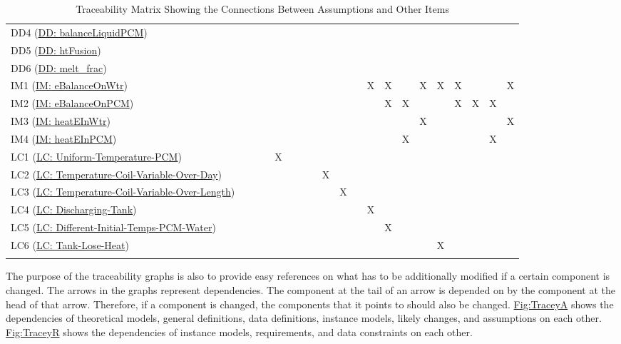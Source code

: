 \documentclass[12pt]{article}
\begin{document}
\begin{longtable}{l l l l l l l l l l l l l l l l l l l l}
DD4 (\hyperref[DD:balanceLiquidPCM]{DD: balanceLiquidPCM}) &  &  &  &  &  &  &  &  &  &  &  &  &  &  &  &  &  &  & 
\\
DD5 (\hyperref[DD:htFusion]{DD: htFusion}) &  &  &  &  &  &  &  &  &  &  &  &  &  &  &  &  &  &  & 
\\
DD6 (\hyperref[DD:melt.frac]{DD: melt\_frac}) &  &  &  &  &  &  &  &  &  &  &  &  &  &  &  &  &  &  & 
\\
IM1 (\hyperref[IM:eBalanceOnWtr]{IM: eBalanceOnWtr}) &  &  &  &  &  &  &  &  &  &  & X & X &  & X & X & X &  &  & X
\\
IM2 (\hyperref[IM:eBalanceOnPCM]{IM: eBalanceOnPCM}) &  &  &  &  &  &  &  &  &  &  &  & X & X &  &  & X & X & X & 
\\
IM3 (\hyperref[IM:heatEInWtr]{IM: heatEInWtr}) &  &  &  &  &  &  &  &  &  &  &  &  &  & X &  &  &  &  & X
\\
IM4 (\hyperref[IM:heatEInPCM]{IM: heatEInPCM}) &  &  &  &  &  &  &  &  &  &  &  &  & X &  &  &  &  & X & 
\\
LC1 (\hyperref[likeChgUTP]{LC: Uniform-Temperature-PCM}) &  &  &  & X &  &  &  &  &  &  &  &  &  &  &  &  &  &  & 
\\
LC2 (\hyperref[likeChgTCVOD]{LC: Temperature-Coil-Variable-Over-Day}) &  &  &  &  &  &  &  & X &  &  &  &  &  &  &  &  &  &  & 
\\
LC3 (\hyperref[likeChgTCVOL]{LC: Temperature-Coil-Variable-Over-Length}) &  &  &  &  &  &  &  &  & X &  &  &  &  &  &  &  &  &  & 
\\
LC4 (\hyperref[likeChgDT]{LC: Discharging-Tank}) &  &  &  &  &  &  &  &  &  &  & X &  &  &  &  &  &  &  & 
\\
LC5 (\hyperref[likeChgDITPW]{LC: Different-Initial-Temps-PCM-Water}) &  &  &  &  &  &  &  &  &  &  &  & X &  &  &  &  &  &  & 
\\
LC6 (\hyperref[likeChgTLH]{LC: Tank-Lose-Heat}) &  &  &  &  &  &  &  &  &  &  &  &  &  &  & X &  &  &  & 
\\
\bottomrule
\caption{Traceability Matrix Showing the Connections Between Assumptions and Other Items}
\label{Table:Tracey3}
\end{longtable}
The purpose of the traceability graphs is also to provide easy references on what has to be additionally modified if a certain component is changed. The arrows in the graphs represent dependencies. The component at the tail of an arrow is depended on by the component at the head of that arrow. Therefore, if a component is changed, the components that it points to should also be changed. \hyperref[Figure:TraceyA]{Fig:TraceyA} shows the dependencies of theoretical models, general definitions, data definitions, instance models, likely changes, and assumptions on each other. \hyperref[Figure:TraceyR]{Fig:TraceyR} shows the dependencies of instance models, requirements, and data constraints on each other.
\end{document}
